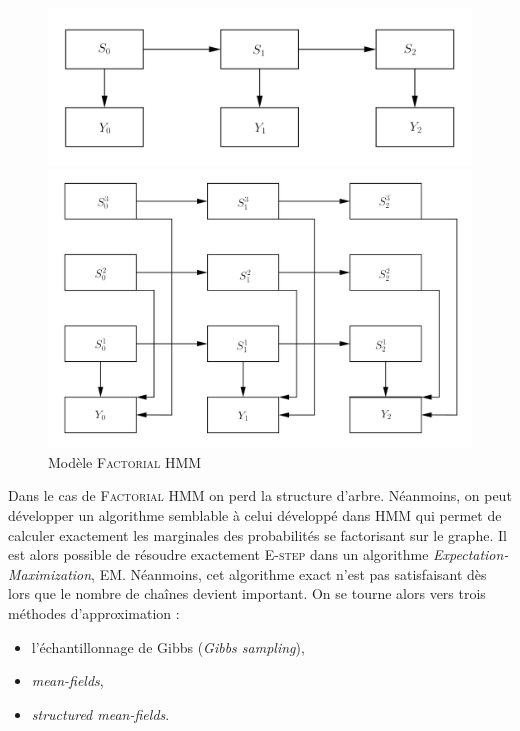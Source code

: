 \documentclass[10pt,a4paper]{article}
\newcommand{\hmm}{\textsc{HMM}}
\newcommand{\fhmm}{\textsc{Factorial HMM}}
\newcommand{\Estep}{\textsc{E-step}}
\newcommand{\EM}{\textsc{EM}}
\begin{document}
\begin{figure}[H]
  \centering
  \begin{minipage}{.46\linewidth}
    \centering
      \includegraphics[scale=0.1]{../resources/pictures/graph1.png}
      \caption{Modèle \hmm}
  \end{minipage}
  \begin{minipage}{.46\linewidth}
    \centering
      \includegraphics[scale=0.1]{../resources/pictures/graph2.png}
      \caption{Modèle \fhmm}
  \end{minipage}
\end{figure}

Dans le cas de \fhmm{} on perd la structure d'arbre.
Néanmoins, on peut développer un algorithme semblable à celui développé dans 
\hmm{} qui permet de calculer exactement les marginales des probabilités se 
factorisant sur le graphe.
Il est alors possible de résoudre exactement \Estep{} dans un algorithme 
\emph{Expectation-Maximization}, \EM. Néanmoins, cet algorithme exact n'est pas 
satisfaisant dès lors que le nombre de chaînes devient important.
On se tourne alors vers trois méthodes d'approximation :
\begin{itemize}
  \item l'échantillonnage de Gibbs (\emph{Gibbs sampling}),
  \item \textit{mean-fields},
  \item \textit{structured mean-fields}.
\end{itemize}
\end{document}
